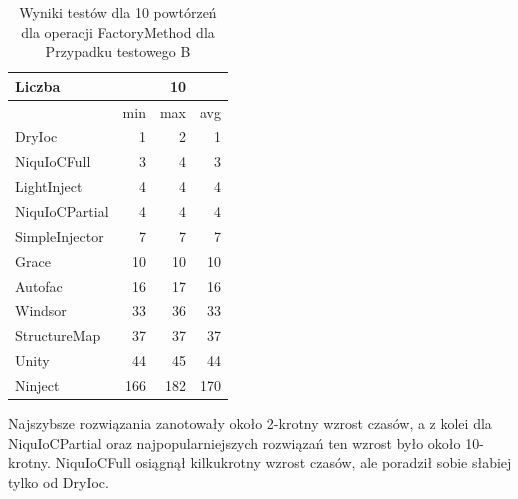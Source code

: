 \documentclass[12pt]{article}
\begin{document}
\begin{table}[H]
\captionsetup{belowskip=0pt,aboveskip=0pt}
\begin{center}
\begin{small}
	\begin{tabular}{ | l | r r r | }
    		\hline
Liczba & & 10 & \\ \hline
 & min & max & avg \\ \hline
DryIoc & 1 & 2 & 1 \\ \hline
NiquIoCFull & 3 & 4 & 3 \\ \hline
LightInject & 4 & 4 & 4 \\ \hline
NiquIoCPartial & 4 & 4 & 4 \\ \hline
SimpleInjector & 7 & 7 & 7 \\ \hline
Grace & 10 & 10 & 10 \\ \hline
Autofac & 16 & 17 & 16 \\ \hline
Windsor & 33 & 36 & 33 \\ \hline
StructureMap & 37 & 37 & 37 \\ \hline
Unity & 44 & 45 & 44 \\ \hline
Ninject & 166 & 182 & 170 \\ \hline
  	\end{tabular}
\end{small}
\end{center}
\caption{Wyniki testów dla 10 powtórzeń dla operacji FactoryMethod dla Przypadku testowego B}
\label{TestCaseB_FactoryMethod10}
\end{table}
Najszybsze rozwiązania zanotowały około 2-krotny wzrost czasów, a z kolei dla NiquIoCPartial oraz najpopularniejszych rozwiązań ten wzrost było około 10-krotny. NiquIoCFull osiągnął kilkukrotny wzrost czasów, ale poradził sobie słabiej tylko od DryIoc.
\\ \\
\end{document}
